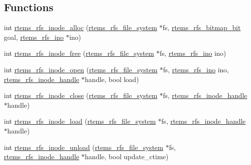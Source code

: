 \subsection*{Functions}
\begin{DoxyCompactItemize}
\item 
int \mbox{\hyperlink{rtems-rfs-inode_8h_a3debf4c8c9f9149e355abd82a1804e44}{rtems\+\_\+rfs\+\_\+inode\+\_\+alloc}} (\mbox{\hyperlink{struct__rtems__rfs__file__system}{rtems\+\_\+rfs\+\_\+file\+\_\+system}} $\ast$fs, \mbox{\hyperlink{rtems-rfs-bitmaps_8h_acc1b0aefe1b090890ccbc1b05279a78e}{rtems\+\_\+rfs\+\_\+bitmap\+\_\+bit}} goal, \mbox{\hyperlink{rtems-rfs-inode_8h_ae658325c3ff9941f2e68315d20e3c723}{rtems\+\_\+rfs\+\_\+ino}} $\ast$ino)
\item 
int \mbox{\hyperlink{rtems-rfs-inode_8h_a644fd4c2be2a40b4d9535d01f3279db2}{rtems\+\_\+rfs\+\_\+inode\+\_\+free}} (\mbox{\hyperlink{struct__rtems__rfs__file__system}{rtems\+\_\+rfs\+\_\+file\+\_\+system}} $\ast$fs, \mbox{\hyperlink{rtems-rfs-inode_8h_ae658325c3ff9941f2e68315d20e3c723}{rtems\+\_\+rfs\+\_\+ino}} ino)
\item 
int \mbox{\hyperlink{rtems-rfs-inode_8h_a3eaae78410d715b273bf1323bdd39a94}{rtems\+\_\+rfs\+\_\+inode\+\_\+open}} (\mbox{\hyperlink{struct__rtems__rfs__file__system}{rtems\+\_\+rfs\+\_\+file\+\_\+system}} $\ast$fs, \mbox{\hyperlink{rtems-rfs-inode_8h_ae658325c3ff9941f2e68315d20e3c723}{rtems\+\_\+rfs\+\_\+ino}} ino, \mbox{\hyperlink{rtems-rfs-inode_8h_a91f02dac5a2d91e072d676f3266ab8d2}{rtems\+\_\+rfs\+\_\+inode\+\_\+handle}} $\ast$handle, bool load)
\item 
int \mbox{\hyperlink{rtems-rfs-inode_8h_a59a67f021dd8d2257d44145f170afbc4}{rtems\+\_\+rfs\+\_\+inode\+\_\+close}} (\mbox{\hyperlink{struct__rtems__rfs__file__system}{rtems\+\_\+rfs\+\_\+file\+\_\+system}} $\ast$fs, \mbox{\hyperlink{rtems-rfs-inode_8h_a91f02dac5a2d91e072d676f3266ab8d2}{rtems\+\_\+rfs\+\_\+inode\+\_\+handle}} $\ast$handle)
\item 
int \mbox{\hyperlink{rtems-rfs-inode_8h_ab22829804234411322af37285e692832}{rtems\+\_\+rfs\+\_\+inode\+\_\+load}} (\mbox{\hyperlink{struct__rtems__rfs__file__system}{rtems\+\_\+rfs\+\_\+file\+\_\+system}} $\ast$fs, \mbox{\hyperlink{rtems-rfs-inode_8h_a91f02dac5a2d91e072d676f3266ab8d2}{rtems\+\_\+rfs\+\_\+inode\+\_\+handle}} $\ast$handle)
\item 
int \mbox{\hyperlink{rtems-rfs-inode_8h_abeaf719d26450cda93c1111d93aaadea}{rtems\+\_\+rfs\+\_\+inode\+\_\+unload}} (\mbox{\hyperlink{struct__rtems__rfs__file__system}{rtems\+\_\+rfs\+\_\+file\+\_\+system}} $\ast$fs, \mbox{\hyperlink{rtems-rfs-inode_8h_a91f02dac5a2d91e072d676f3266ab8d2}{rtems\+\_\+rfs\+\_\+inode\+\_\+handle}} $\ast$handle, bool update\+\_\+ctime)

\end{DoxyCompactItemize}
